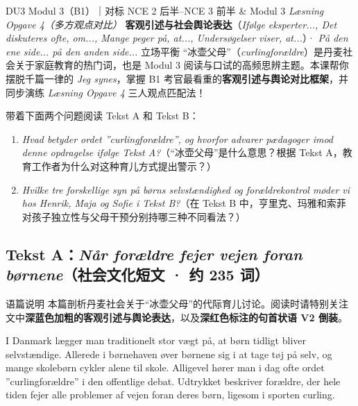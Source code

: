 {DU3 Modul 3（B1）｜对标 NCE 2 后半--NCE 3 前半 \& Modul 3 \textit{Læsning Opgave 4（多方观点对比）}}
{\textbf{客观引述与社会舆论表达}（\textit{Ifølge eksperter..., Det diskuteres ofte, om..., Mange peger på, at..., Undersøgelser viser, at...}）· \textit{På den ene side... på den anden side...} 立场平衡}
{“冰壶父母”（\textit{curlingforældre}）是丹麦社会关于家庭教育的热门词，也是 Modul 3 阅读与口试的高频思辨主题。本课帮你摆脱千篇一律的 \textit{Jeg synes}，掌握 B1 考官最看重的\textbf{客观引述与舆论对比框架}，并同步演练 \textit{Læsning Opgave 4} 三人观点匹配法！}

\begin{foerduleaeser}
带着下面两个问题阅读 Tekst A 和 Tekst B：
\begin{enumerate}
  \item \textit{Hvad betyder ordet ”curlingforældre”, og hvorfor advarer pædagoger imod denne opdragelse ifølge Tekst A?}（“冰壶父母”是什么意思？根据 Tekst A，教育工作者为什么对这种育儿方式提出警示？）
  \item \textit{Hvilke tre forskellige syn på børns selvstændighed og forældrekontrol møder vi hos Henrik, Maja og Sofie i Tekst B?}（在 Tekst B 中，亨里克、玛雅和索菲对孩子独立性与父母干预分别持哪三种不同看法？）
\end{enumerate}
\end{foerduleaeser}


\subsection*{Tekst A：\textit{Når forældre fejer vejen foran børnene}（社会文化短文 · 约 235 词）}

\begin{tipbox}{语篇说明}
本篇剖析丹麦社会关于“冰壶父母”的代际育儿讨论。阅读时请特别关注文中\textbf{\color{NCDNavy}深蓝色加粗的客观引述与舆论表达}，以及\textbf{\color{NCDRed}深红色标注的句首状语 V2 倒装}。
\end{tipbox}

I Danmark lægger man traditionelt stor vægt på, at børn tidligt bliver selvstændige. Allerede i børnehaven øver børnene sig i at tage tøj på selv, og mange skolebørn cykler alene til skole. Alligevel hører man i dag ofte ordet ”curlingforældre” i den offentlige debat. Udtrykket beskriver forældre, der hele tiden fejer alle problemer af vejen foran deres børn, ligesom i sporten curling.

